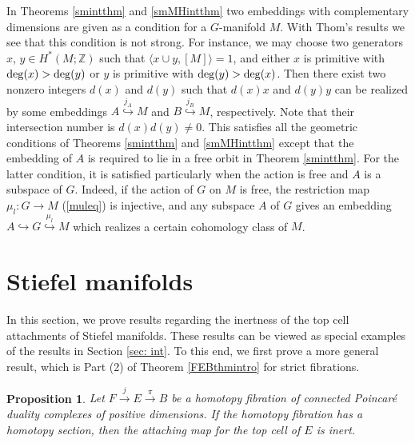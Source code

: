 \documentclass[a4]{amsart}
\newtheorem{proposition}[theorem]{Proposition}
\theoremstyle{definition}
\begin{document}
\begin{sloppypar}
In Theorems \ref{smintthm} and \ref{smMHintthm} two embeddings with complementary dimensions are given as a condition for a $G$-manifold $M$. With Thom's results we see that this condition is not strong. For instance, we may choose two generators $x$, $y\in H^{\ast}(M;\mathbb{Z})$ such that $\langle x\cup y, [M]\rangle=1$, and either $x$ is primitive with ${\rm deg}(x)>{\rm deg}(y)$ or $y$ is primitive with ${\rm deg}(y)>{\rm deg}(x)$. Then there exist two nonzero integers $d(x)$ and $d(y)$ such that $d(x)x$ and $d(y)y$ can be realized by some embeddings $A\stackrel{j_A}{\hookrightarrow} M$ and $B\stackrel{j_B}{\hookrightarrow} M$, respectively. Note that their intersection number is $d(x)d(y)\neq 0$. This satisfies all the geometric conditions of Theorems \ref{smintthm} and \ref{smMHintthm} except that the embedding of $A$ is required to lie in a free orbit in Theorem \ref{smintthm}. For the latter condition, it is satisfied particularly when the action is free and $A$ is a subspace of $G$. Indeed, if the action of $G$ on $M$ is free, the restriction map $\mu_l: G\longrightarrow M$ (\ref{muleq}) is injective, and any subspace $A$ of $G$ gives an embedding $A\stackrel{}{\hookrightarrow} G\stackrel{\mu_l}{\hookrightarrow} M$ which realizes a certain cohomology class of $M$. 


\newpage

\section{Stiefel manifolds}
\label{sec: degen}
In this section, we prove results regarding the inertness of the top cell attachments of Stiefel manifolds. These results can be viewed as special examples of the results in Section \ref{sec: int}. To this end, we first prove a more general result, which is Part (2) of Theorem \ref{FEBthmintro} for strict fibrations.

\begin{proposition}\label{FEBprop}
Let $F\stackrel{j}{\longrightarrow} E\stackrel{\pi}{\longrightarrow} B$ be a homotopy fibration of connected Poincar\'{e} duality complexes of positive dimensions. 
If the homotopy fibration has a homotopy section, then the attaching map for the top cell of $E$ is inert.


\end{proposition}
\end{sloppypar}
\end{document}
